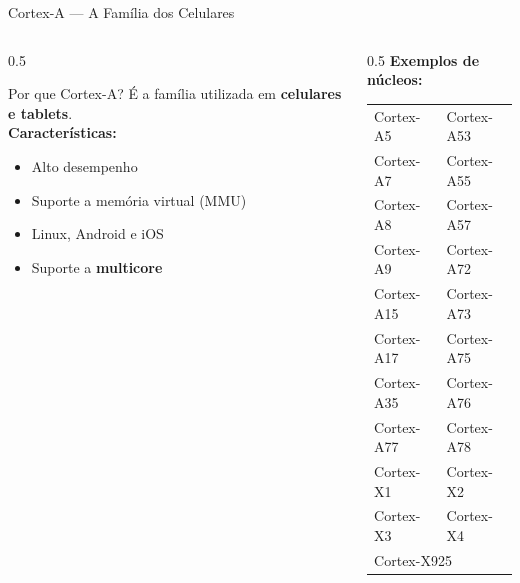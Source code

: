 \documentclass[aspectratio=169]{beamer}
\begin{document}
\begin{frame}{Cortex-A — A Família dos Celulares}
    \begin{columns}[T]
        \begin{column}{0.5\textwidth}
            \begin{block}{Por que Cortex-A?}
                É a família utilizada em \textbf{celulares e tablets}.\\[0.4em]
                \textbf{Características:}
                \begin{itemize}
                    \item Alto desempenho
                    \item Suporte a memória virtual (MMU)
                    \item Linux, Android e iOS
                    \item Suporte a \textbf{multicore}
                \end{itemize}
            \end{block}
        \end{column}
        \begin{column}{0.5\textwidth}
            \textbf{Exemplos de núcleos:}
            \vspace{0.3em}

            {\footnotesize
            \begin{tabular}{ll}
                Cortex-A5   & Cortex-A53 \\
                Cortex-A7   & Cortex-A55 \\
                Cortex-A8   & Cortex-A57 \\
                Cortex-A9   & Cortex-A72 \\
                Cortex-A15  & Cortex-A73 \\
                Cortex-A17  & Cortex-A75 \\
                Cortex-A35  & Cortex-A76 \\
                Cortex-A77  & Cortex-A78 \\
                Cortex-X1   & Cortex-X2  \\
                Cortex-X3   & Cortex-X4  \\
                \multicolumn{2}{l}{Cortex-X925} \\
            \end{tabular}
            }
            \vspace{0.5em}
            
        \end{column}
    \end{columns}
\end{frame}
\end{document}
